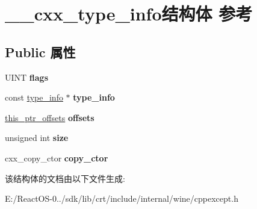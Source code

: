 \hypertarget{struct____cxx__type__info}{}\section{\+\_\+\+\_\+cxx\+\_\+type\+\_\+info结构体 参考}
\label{struct____cxx__type__info}
\subsection*{Public 属性}
\begin{DoxyCompactItemize}
\item 
\mbox{\label{struct____cxx__type__info_a6fefd00262abf5160452aa0eac13bcdd}} 
U\+I\+NT {\bfseries flags}
\item 
\mbox{\label{struct____cxx__type__info_ab03f9b61305b11d2559ee6964758bde2}} 
const \hyperlink{struct____type__info}{type\+\_\+info} $\ast$ {\bfseries type\+\_\+info}
\item 
\mbox{\label{struct____cxx__type__info_ab436a71bbc177a9b7d9c280d3f8aa16d}} 
\hyperlink{structthis__ptr__offsets}{this\+\_\+ptr\+\_\+offsets} {\bfseries offsets}
\item 
\mbox{\label{struct____cxx__type__info_adfe4d37da6b20ab4948502779a22e6ab}} 
unsigned int {\bfseries size}
\item 
\mbox{\label{struct____cxx__type__info_a346cd4abca0a213af0adcd3b9d00f30b}} 
cxx\+\_\+copy\+\_\+ctor {\bfseries copy\+\_\+ctor}
\end{DoxyCompactItemize}


该结构体的文档由以下文件生成\+:\begin{DoxyCompactItemize}
\item 
E\+:/\+React\+O\+S-\/0../sdk/lib/crt/include/internal/wine/cppexcept.\+h\end{DoxyCompactItemize}
